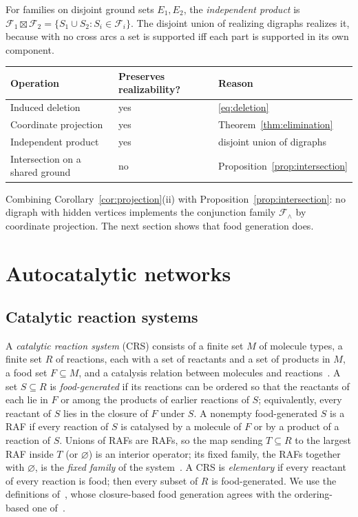 \documentclass[11pt,a4paper]{article}
\theoremstyle{plain}
\theoremstyle{definition}
\theoremstyle{remark}
\newcommand{\cF}{\mathcal F}
\begin{document}
For families on disjoint ground sets $E_1,E_2$, the \emph{independent product} is $\cF_1\boxtimes\cF_2=\{S_1\cup S_2:S_i\in\cF_i\}$. The disjoint union of realizing digraphs realizes it, because with no cross arcs a set is supported iff each part is supported in its own component.

\begin{center}
\begin{tabular}{@{}lll@{}}
\toprule
Operation & Preserves realizability? & Reason\\
\midrule
Induced deletion & yes & \eqref{eq:deletion}\\
Coordinate projection & yes & Theorem~\ref{thm:elimination}\\
Independent product & yes & disjoint union of digraphs\\
Intersection on a shared ground & no & Proposition~\ref{prop:intersection}\\
\bottomrule
\end{tabular}
\end{center}

Combining Corollary~\ref{cor:projection}(ii) with Proposition~\ref{prop:intersection}: no digraph with hidden vertices implements the conjunction family $\cF_\wedge$ by coordinate projection. The next section shows that food generation does.

\section{Autocatalytic networks}\label{sec:raf}

\subsection{Catalytic reaction systems}

A \emph{catalytic reaction system} (CRS) consists of a finite set $M$ of molecule types, a finite set $R$ of reactions, each with a set of reactants and a set of products in $M$, a food set $F\subseteq M$, and a catalysis relation between molecules and reactions~\cite{hordijk2004detecting,steel2019autocatalytic}. A set $S\subseteq R$ is \emph{food-generated} if its reactions can be ordered so that the reactants of each lie in $F$ or among the products of earlier reactions of $S$; equivalently, every reactant of $S$ lies in the closure of $F$ under $S$. A nonempty food-generated $S$ is a RAF if every reaction of $S$ is catalysed by a molecule of $F$ or by a product of a reaction of $S$. Unions of RAFs are RAFs, so the map sending $T\subseteq R$ to the largest RAF inside $T$ (or $\varnothing$) is an interior operator; its fixed family, the RAFs together with $\varnothing$, is the \emph{fixed family} of the system~\cite{steel2023interior}. A CRS is \emph{elementary} if every reactant of every reaction is food; then every subset of $R$ is food-generated. We use the definitions of~\cite{companion2026antimatroid}, whose closure-based food generation agrees with the ordering-based one of~\cite{hordijk2004detecting}.
\end{document}
